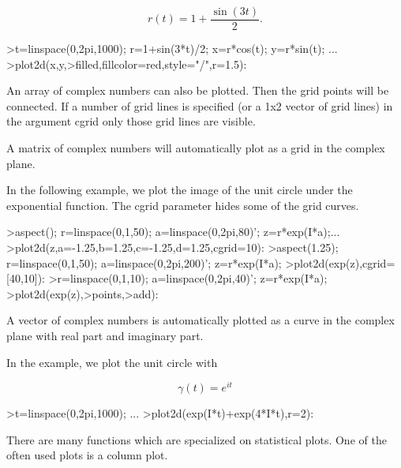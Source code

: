 \documentclass[a4paper,10pt]{article}
\begin{document}
\begin{eulernotebook}
\begin{eulercomment}
\begin{eulercomment}
\begin{eulercomment}
\begin{eulercomment}
\begin{eulercomment}
\end{eulercomment}
\begin{eulerformula}
\[
r(t) = 1 + \dfrac{\sin(3t)}{2}.
\]
\end{eulerformula}
\begin{eulerprompt}
>t=linspace(0,2pi,1000); r=1+sin(3*t)/2; x=r*cos(t); y=r*sin(t); ...
>plot2d(x,y,>filled,fillcolor=red,style="/",r=1.5):
\end{eulerprompt}
\begin{eulercomment}
An array of complex numbers can also be plotted. Then the grid points will be
connected. If a number of grid lines is specified (or a 1x2 vector of grid lines) in
the argument cgrid only those grid lines are visible.

A matrix of complex numbers will automatically plot as a grid in the complex plane.

In the following example, we plot the image of the unit circle under the exponential
function. The cgrid parameter hides some of the grid curves.
\end{eulercomment}
\begin{eulerprompt}
>aspect(); r=linspace(0,1,50); a=linspace(0,2pi,80)'; z=r*exp(I*a);...
>plot2d(z,a=-1.25,b=1.25,c=-1.25,d=1.25,cgrid=10):
>aspect(1.25); r=linspace(0,1,50); a=linspace(0,2pi,200)'; z=r*exp(I*a);
>plot2d(exp(z),cgrid=[40,10]):
>r=linspace(0,1,10); a=linspace(0,2pi,40)'; z=r*exp(I*a);
>plot2d(exp(z),>points,>add):
\end{eulerprompt}
\begin{eulercomment}
A vector of complex numbers is automatically plotted as a curve in the complex plane
with real part and imaginary part.

In the example, we plot the unit circle with

\end{eulercomment}
\begin{eulerformula}
\[
\gamma(t) = e^{it}
\]
\end{eulerformula}
\begin{eulerprompt}
>t=linspace(0,2pi,1000); ...
>plot2d(exp(I*t)+exp(4*I*t),r=2):
\end{eulerprompt}
\begin{eulercomment}
There are many functions which are specialized on statistical plots. One of the often
used plots is a column plot.


\end{eulercomment}
\end{eulercomment}
\end{eulercomment}
\end{eulercomment}
\end{eulercomment}
\end{eulernotebook}
\end{document}
